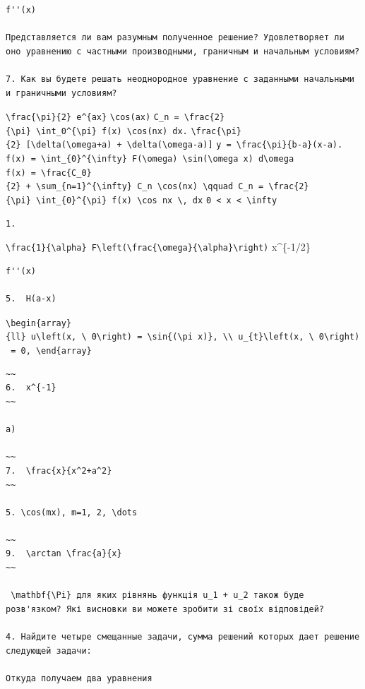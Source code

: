 \documentclass[
  ukrainian,
]{article}
\begin{document}
\begin{verbatim}
f''(x)

Представляется ли вам разумным полученное решение? Удовлетворяет ли оно уравнению с частными производными, граничным и начальным условиям?

7. Как вы будете решать неоднородное уравнение с заданными начальными и граничными условиям?
\end{verbatim}

\texttt{\textbackslash{}frac\{\textbackslash{}pi\}\{2\}\ e\^{}\{ax\}}
\texttt{\textbackslash{}cos(ax)}
\texttt{C\_n\ =\ \textbackslash{}frac\{2\}\{\textbackslash{}pi\}\ \textbackslash{}int\_0\^{}\{\textbackslash{}pi\}\ f(x)\ \textbackslash{}cos(nx)\ dx.}
\texttt{\textbackslash{}frac\{\textbackslash{}pi\}\{2\}\ {[}\textbackslash{}delta(\textbackslash{}omega+a)\ +\ \textbackslash{}delta(\textbackslash{}omega-a){]}}
\texttt{y\ =\ \textbackslash{}frac\{\textbackslash{}pi\}\{b-a\}(x-a).}
\texttt{f(x)\ =\ \textbackslash{}int\_\{0\}\^{}\{\textbackslash{}infty\}\ F(\textbackslash{}omega)\ \textbackslash{}sin(\textbackslash{}omega\ x)\ d\textbackslash{}omega}
\texttt{f(x)\ =\ \textbackslash{}frac\{C\_0\}\{2\}\ +\ \textbackslash{}sum\_\{n=1\}\^{}\{\textbackslash{}infty\}\ C\_n\ \textbackslash{}cos(nx)\ \textbackslash{}qquad\ C\_n\ =\ \textbackslash{}frac\{2\}\{\textbackslash{}pi\}\ \textbackslash{}int\_\{0\}\^{}\{\textbackslash{}pi\}\ f(x)\ \textbackslash{}cos\ nx\ \textbackslash{},\ dx}
\texttt{0\ \textless{}\ x\ \textless{}\ \textbackslash{}infty}

\begin{verbatim}
1.
\end{verbatim}

\texttt{\textbackslash{}frac\{1\}\{\textbackslash{}alpha\}\ F\textbackslash{}left(\textbackslash{}frac\{\textbackslash{}omega\}\{\textbackslash{}alpha\}\textbackslash{}right)}
x\^{}\{-1/2\}

\begin{verbatim}
f''(x)

5.  H(a-x)
\end{verbatim}

\texttt{\textbackslash{}begin\{array\}\{ll\}\ u\textbackslash{}left(x,\ \textbackslash{}\ 0\textbackslash{}right)\ =\ \textbackslash{}sin\{(\textbackslash{}pi\ x)\},\ \textbackslash{}\textbackslash{}\ u\_\{t\}\textbackslash{}left(x,\ \textbackslash{}\ 0\textbackslash{}right)\ =\ 0,\ \textbackslash{}end\{array\}}

\begin{verbatim}
~~
6.  x^{-1} 
~~

a)

~~
7.  \frac{x}{x^2+a^2} 
~~

5. \cos(mx), m=1, 2, \dots 

~~
9.  \arctan \frac{a}{x} 
~~

 \mathbf{\Pi} для яких рівнянь функція u_1 + u_2 також буде розв'язком? Які висновки ви можете зробити зі своїх відповідей?

4. Найдите четыре смещанные задачи, сумма решений которых дает решение следующей задачи:

Откуда получаем два уравнения
\end{verbatim}
\end{document}

